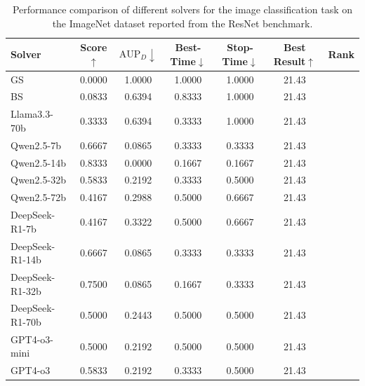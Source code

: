 \begin{table}[h]
    \centering
    \setlength{\tabcolsep}{3pt}
    \renewcommand\arraystretch{1.5}
    \caption{Performance comparison of different solvers for the image classification task on the ImageNet dataset reported from the ResNet benchmark.}
    \begin{tabular}{l|cccccc}
    \toprule
    Solver           & Score$\uparrow$ & $\text{AUP}_D\downarrow$ & Best-Time$\downarrow$ & Stop-Time$\downarrow$ & Best Result$\uparrow$ & Rank \\
    \midrule
    GS & 0.0000 & 1.0000 & 1.0000 & 1.0000 & 21.43 \\
    BS & 0.0833 & 0.6394 & 0.8333 & 1.0000 & 21.43 \\
    Llama3.3-70b & 0.3333 & 0.6394 & 0.3333 & 1.0000 & 21.43 \\
    Qwen2.5-7b & 0.6667 & 0.0865 & 0.3333 & 0.3333 & 21.43 \\
    Qwen2.5-14b & 0.8333 & 0.0000 & 0.1667 & 0.1667 & 21.43 \\
    Qwen2.5-32b & 0.5833 & 0.2192 & 0.3333 & 0.5000 & 21.43 \\
    Qwen2.5-72b & 0.4167 & 0.2988 & 0.5000 & 0.6667 & 21.43 \\
    DeepSeek-R1-7b & 0.4167 & 0.3322 & 0.5000 & 0.6667 & 21.43 \\
    DeepSeek-R1-14b & 0.6667 & 0.0865 & 0.3333 & 0.3333 & 21.43 \\
    DeepSeek-R1-32b & 0.7500 & 0.0865 & 0.1667 & 0.3333 & 21.43 \\
    DeepSeek-R1-70b & 0.5000 & 0.2443 & 0.5000 & 0.5000 & 21.43 \\
    GPT4-o3-mini & 0.5000 & 0.2192 & 0.5000 & 0.5000 & 21.43 \\
    GPT4-o3 & 0.5833 & 0.2192 & 0.3333 & 0.5000 & 21.43 \\
    \bottomrule
    \end{tabular}
    \label{tab:ResNet}
\end{table}



